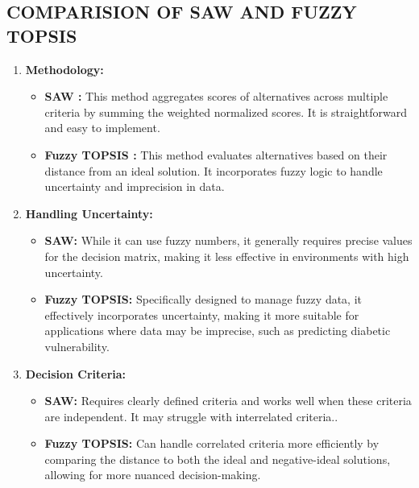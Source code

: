 \documentclass[12pt,a4paper]{article}
\begin{document}
\subsection{COMPARISION OF SAW AND FUZZY TOPSIS}
\begin{enumerate}
    \item \textbf{Methodology:}
    \begin{itemize}
        \item \textbf{SAW :} This method aggregates scores of alternatives across multiple criteria by summing the weighted normalized scores. It is straightforward and easy to implement.

        \item \textbf{Fuzzy TOPSIS :} This method evaluates alternatives based on their distance from an ideal solution. It incorporates fuzzy logic to handle uncertainty and imprecision in data.

        
    \end{itemize}

    \item \textbf{Handling Uncertainty:}
    \begin{itemize}
        \item \textbf{SAW: } While it can use fuzzy numbers, it generally requires precise values for the decision matrix, making it less effective in environments with high uncertainty.

        \item \textbf{Fuzzy TOPSIS: } Specifically designed to manage fuzzy data, it effectively incorporates uncertainty, making it more suitable for applications where data may be imprecise, such as predicting diabetic vulnerability.    
 
    \end{itemize}


    \item \textbf{Decision Criteria:}
    \begin{itemize}
        \item \textbf{SAW: } Requires clearly defined criteria and works well when these criteria are independent. It may struggle with interrelated criteria..

        \item \textbf{Fuzzy TOPSIS: } Can handle correlated criteria more efficiently by comparing the distance to both the ideal and negative-ideal solutions, allowing for more nuanced decision-making.  
 
    \end{itemize}


\end{enumerate}
\end{document}
